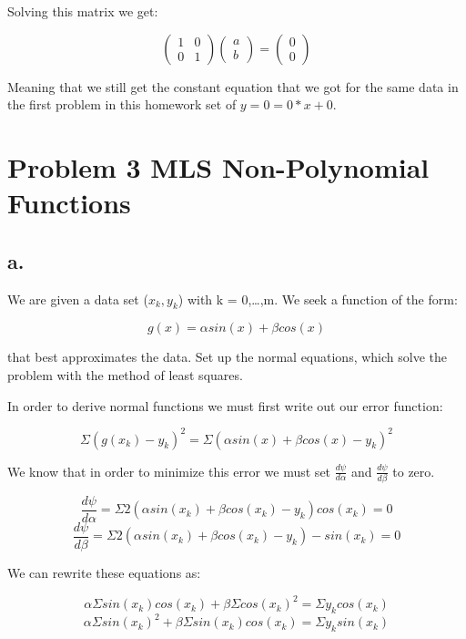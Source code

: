 \documentclass[]{article}
\begin{document}
Solving this matrix we get:

\[
\left(\begin{array}{cc} 
1 & 0\\
0 & 1
\end{array}\right)
\left(\begin{array}{c} 
a \\
b 
\end{array}\right) =
\left(\begin{array}{c}
0 \\
0 
\end{array}\right)
\]

Meaning that we still get the constant equation that we got for the same
data in the first problem in this homework set of \(y=0 = 0*x + 0\).

\section{Problem 3 MLS Non-Polynomial
Functions}\label{problem-3-mls-non-polynomial-functions}

\subsection{a.}\label{a.}

We are given a data set (\(x_k, y_k\)) with k = 0,\ldots{},m. We seek a
function of the form:

\[g(x) = \alpha sin(x) + \beta cos(x)\]

that best approximates the data. Set up the normal equations, which
solve the problem with the method of least squares.

In order to derive normal functions we must first write out our error
function:

\[\Sigma(g(x_k) - y_k)^2=\Sigma(\alpha sin(x) + \beta cos(x)- y_k)^2\]

We know that in order to minimize this error we must set
\(\frac{d\psi}{d\alpha}\) and \(\frac{d\psi}{d\beta}\) to zero.

\[\frac{d\psi}{d\alpha}= \Sigma2(\alpha sin(x_k) + \beta cos(x_k)- y_k)cos(x_k) = 0\]
\[\frac{d\psi}{d\beta}= \Sigma2(\alpha sin(x_k) + \beta cos(x_k)- y_k)-sin(x_k) = 0\]

We can rewrite these equations as:

\[\alpha \Sigma sin(x_k)cos(x_k) + \beta \Sigma cos(x_k)^2 = \Sigma y_kcos(x_k)\]
\[\alpha \Sigma sin(x_k)^2 + \beta \Sigma sin(x_k)cos(x_k) = \Sigma y_ksin(x_k)\]
\end{document}
